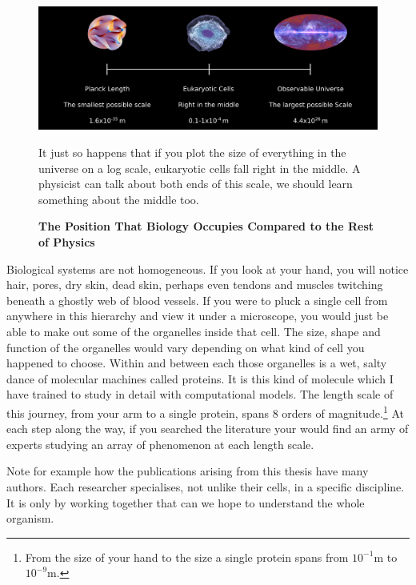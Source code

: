 \begin{figure}
	\begin{center}
		\includegraphics[width=1.0\textwidth]{figures/scales.png}
	\end{center}
	\captionsetup{singlelinecheck = false, justification=raggedright}
	\caption[The Position That Biology Occupies Compared to the Rest of Physics] {\textbf{The Position That Biology Occupies Compared to the Rest of Physics}}{It just so happens that if you plot the size of everything  in the universe on a log scale, eukaryotic cells fall right in the middle. A physicist can talk about both ends of this scale, we should learn something about the middle too.}
	\label{length_scales}
\end{figure}

Biological systems are not homogeneous. If you look at your hand, you will notice hair, pores, dry skin, dead skin, perhaps even tendons and muscles twitching beneath a ghostly web of blood vessels. If you were to pluck a single cell from anywhere in this hierarchy and view it under a microscope, you would just be able to make out some of the organelles inside that cell. The size, shape and function of the organelles would vary depending on what kind of cell you happened to choose. Within and between each those organelles is a wet, salty dance of molecular machines called proteins. It is this kind of molecule which I have trained to study in detail with computational models. The length scale of this journey, from your arm to a single protein, spans 8 orders of magnitude.\footnote{ From the size of your hand to the size a single protein spans from $10^{-1}$m  to $10^{-9}$m.} At each step along the way, if you searched the literature your would find an army of experts studying an array of phenomenon at each length scale. 

Note for example how the publications arising from this thesis have many authors. Each researcher specialises, not unlike their cells, in a specific discipline. It is only by working together that can we hope to understand the whole organism.

